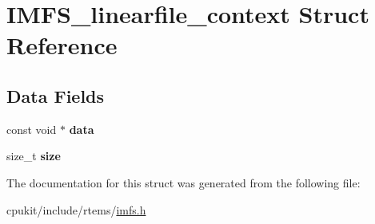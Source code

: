 \hypertarget{structIMFS__linearfile__context}{}\section{I\+M\+F\+S\+\_\+linearfile\+\_\+context Struct Reference}
\label{structIMFS__linearfile__context}
\subsection*{Data Fields}
\begin{DoxyCompactItemize}
\item 
\mbox{\label{structIMFS__linearfile__context_ad297db2ec36cfcaf659d6b0807c5f41b}} 
const void $\ast$ {\bfseries data}
\item 
\mbox{\label{structIMFS__linearfile__context_ad624504a84aa516111b1eb7f45a527da}} 
size\+\_\+t {\bfseries size}
\end{DoxyCompactItemize}


The documentation for this struct was generated from the following file\+:\begin{DoxyCompactItemize}
\item 
cpukit/include/rtems/\mbox{\hyperlink{imfs_8h}{imfs.\+h}}\end{DoxyCompactItemize}
